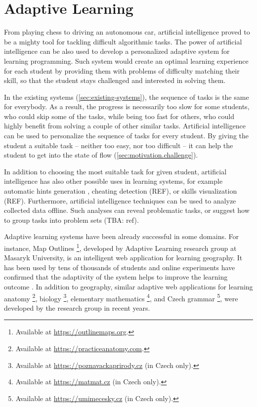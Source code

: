 \chapter{Adaptive Learning}
\label{chap:adaptive-learning}


From playing chess to driving an autonomous car,
  artificial intelligence proved to be a mighty tool
  for tackling difficult algorithmic tasks.
The power of artificial intelligence can be also used
  to develop a personalized adaptive system for learning programming.
Such system would create an optimal learning experience for each student
  by providing them with problems of difficulty matching their skill,
  so that the student stays challenged and interested in solving them.

In the existing systems (\ref{sec:existing-systems}),
  the sequence of tasks is the same for everybody.
As a result, the progress is necessarily too slow for some students,
  who could skip some of the tasks,
  while being too fast for others,
  who could highly benefit from solving a couple of other similar tasks.
Artificial intelligence can be used to personalize
  the sequence of tasks for every student.
By giving the student a suitable task
  -- neither too easy, nor too difficult --
  it can help the student to get into the state of flow
  (\ref{sec:motivation.challenge}).

In addition to choosing the most suitable task for given student,
  artificial intelligence has also other possible uses in learning systems,
  for example automatic hints generation \cite{generating-hints},
  cheating detection (REF),
  or skills visualization (REF).
Furthermore, artificial intelligence techniques can be used
  to analyze collected data offline.
Such analyses can reveal problematic tasks,
  or suggest how to group tasks into problem sets (TBA: ref).

Adaptive learning systems have been already successful in some domains.
For instance, Map Outlines%
  \footnote{Available at \url{https://outlinemaps.org}.},
  developed by Adaptive Learning research group at Masaryk University,
  is an intelligent web application for learning geography.
It has been used by tens of thousands of students
  and online experiments have confirmed
  that the adaptivity of the system helps to improve the learning outcome
  \cite{alg.evaluation-geography}.
In addition to geography, similar adaptive web applications
  for learning anatomy%
  \footnote{Available at \url{https://practiceanatomy.com}.},
  biology%
  \footnote{Available at \url{https://poznavackaprirody.cz} (in Czech only).},
  elementary mathematics%
  \footnote{Available at \url{https://matmat.cz} (in Czech only).},
  and Czech grammar%
  \footnote{Available at \url{https://umimecesky.cz} (in Czech only).},
  were developed by the research group in recent years.


